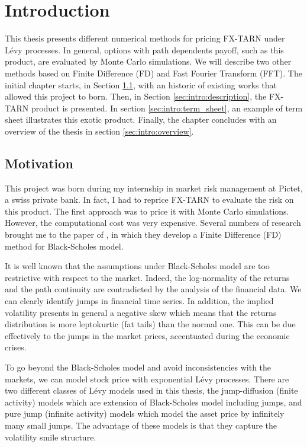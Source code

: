 \chapter{Introduction}
\label{sec:intro}


This thesis presents different numerical methods for pricing FX-TARN under L\'evy processes. In general, options with path dependents payoff, such as this product, are evaluated by Monte Carlo simulations. We will describe two other methods based on Finite Difference (FD) and Fast Fourier Transform (FFT). The initial chapter starts, in Section \ref{sec:intro:motivation}, with an historic of existing works that allowed this project to born. Then, in Section \ref{sec:intro:description}, the FX-TARN product is presented. In section \ref{sec:intro:term_sheet}, an example of term sheet illustrates this exotic product. Finally, the chapter concludes with an overview of the thesis in section \ref{sec:intro:overview}.

\section{Motivation}
\label{sec:intro:motivation}
This project was born during my internship in market risk management at Pictet, a swiss private bank. In fact, I had to reprice FX-TARN to evaluate the risk on this product. The first approach was to price it with Monte Carlo simulations. However, the computational cost was very expensive. Several numbers of research brought me to the paper of \citeauthor{LS15} \citeyearpar{LS15}, in which they develop a Finite Difference (FD) method for Black-Scholes model. 

It is well known that the assumptions under Black-Scholes model are too restrictive with respect to the market. Indeed, the log-normality of the returns and the path continuity are contradicted by the analysis of the financial data. We can clearly identify jumps in financial time series. In addition, the implied volatility presents in general a negative skew which means that the returns distribution is more leptokurtic (fat tails) than the normal one. This can be due effectively to the jumps in the market prices, accentuated during the economic crises.

To go beyond the Black-Scholes model and avoid inconsistencies with the markets, we can model stock price with exponential L\'evy processes. There are two different classes of L\'evy models used in this thesis, the jump-diffusion (finite activity) models which are extension of Black-Scholes model including jumps, and pure jump (infinite activity) models which model the asset price by infinitely many small jumps. The advantage of these models is that they capture
the volatility smile structure. 

